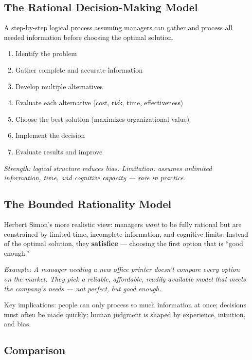 \documentclass[11pt, letterpaper]{article}
\begin{document}
\subsection{The Rational Decision-Making Model}

A step-by-step logical process assuming managers can gather and process all needed information before choosing the optimal solution.

\begin{enumerate}[leftmargin=*, label=\arabic*., nosep]
  \item Identify the problem
  \item Gather complete and accurate information
  \item Develop multiple alternatives
  \item Evaluate each alternative (cost, risk, time, effectiveness)
  \item Choose the best solution (maximizes organizational value)
  \item Implement the decision
  \item Evaluate results and improve
\end{enumerate}

\textit{Strength: logical structure reduces bias. Limitation: assumes unlimited information, time, and cognitive capacity --- rare in practice.}

\subsection{The Bounded Rationality Model}

Herbert Simon's more realistic view: managers \textit{want} to be fully rational but are constrained by limited time, incomplete information, and cognitive limits. Instead of the optimal solution, they \textbf{satisfice} --- choosing the first option that is ``good enough.''

\textit{Example: A manager needing a new office printer doesn't compare every option on the market. They pick a reliable, affordable, readily available model that meets the company's needs --- not perfect, but good enough.}

Key implications: people can only process so much information at once; decisions must often be made quickly; human judgment is shaped by experience, intuition, and bias.

\subsection{Comparison}
\end{document}
